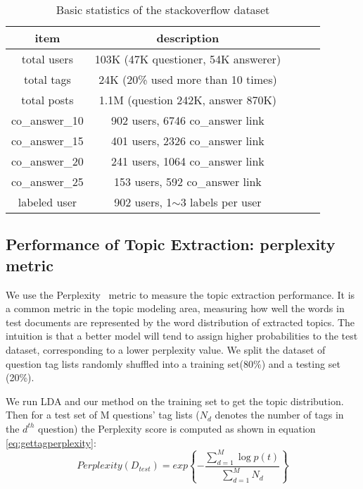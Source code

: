 \begin{table}[htp]
\caption{Basic statistics of the stackoverflow dataset}
\label{tab:stackoverflowdataset}
\centering
\begin{tabular}{|c|c|c|c|c|}
\hline
\textbf{item} & \textbf{description} \\
\hline
total users & 103K (47K questioner, 54K answerer)\\
\hline
total tags & 24K (20\% used more than 10 times)\\
\hline
total posts & 1.1M (question 242K, answer 870K) \\
\hline
co\_answer\_10 & 902 users, 6746 co\_answer link\\
\hline
co\_answer\_15 & 401 users, 2326 co\_answer link\\
\hline
co\_answer\_20 & 241 users, 1064 co\_answer link\\
\hline
co\_answer\_25 & 153 users, 592 co\_answer link\\
\hline
labeled user & 902 users, 1$\sim$3 labels per user\\
\hline
\end{tabular}
\end{table}


\subsection{Performance of Topic Extraction: perplexity metric}
We use the Perplexity~\cite{blei2003latent} metric to measure the topic extraction performance. It is a common metric in the topic modeling area, measuring how well the words in test documents are represented by the word distribution of extracted topics. The intuition is that a better model will tend to assign higher probabilities to the test dataset, corresponding to a lower perplexity value. We split the dataset of question tag lists randomly shuffled into a training set(80\%) and a  testing set (20\%).

We run LDA and our method on the training set to get the topic distribution. Then for a test set of M questions' tag lists ($N_d$ denotes the number of tags in the $d^{th}$ question) the Perplexity score is computed as shown in equation \ref{eq:gettagperplexity}:
\begin{equation}
  Perplexity(D_{test})=exp\left\{-\frac{\sum_{d=1}^{M}\log p(t)}{\sum_{d=1}^{M}N_d}\right\}
\label{eq:gettagperplexity}
\end{equation}


